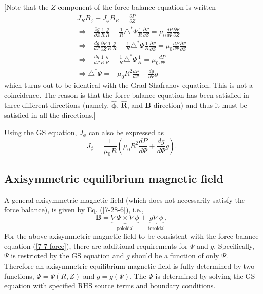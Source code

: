 \documentclass{llncs}
\newcommand{\tmmathbf}[1]{\ensuremath{\boldsymbol{#1}}}
\newcommand{\tmop}[1]{\ensuremath{\operatorname{#1}}}
\begin{document}
[Note that the $Z$ component of the force balance equation is written
\[ \begin{array}{l}
     J_R B_{\phi} - J_{\phi} B_R = \frac{\partial P}{\partial Z}\\
     \Rightarrow - \frac{\partial g}{\partial Z} \frac{1}{R} \frac{g}{R} -
     \frac{1}{R} \triangle^{\ast} \Psi \frac{1}{R} \frac{\partial
     \Psi}{\partial Z} = \mu_0 \frac{d P}{d \Psi} \frac{\partial
     \Psi}{\partial Z}\\
     \Rightarrow - \frac{d g}{d \Psi} \frac{\partial \Psi}{\partial Z}
     \frac{1}{R} \frac{g}{R} - \frac{1}{R} \triangle^{\ast} \Psi \frac{1}{R}
     \frac{\partial \Psi}{\partial Z} = \mu_0 \frac{d P}{d \Psi}
     \frac{\partial \Psi}{\partial Z}\\
     \Rightarrow - \frac{d g}{d \Psi} \frac{1}{R} \frac{g}{R} - \frac{1}{R}
     \triangle^{\ast} \Psi \frac{1}{R} = \mu_0 \frac{d P}{d \Psi}\\
     \Rightarrow \triangle^{\ast} \Psi = - \mu_0 R^2 \frac{d P}{d \Psi} -
     \frac{d g}{d \Psi} g
   \end{array} \]
which turns out to be identical with the Grad-Shafranov equation. This is not
a coincidence. The reason is that the force balance equation has been
satisfied in three different directions (namely, $\hat{\tmmathbf{\phi}}$,
$\hat{\mathbf{R}}$, and $\mathbf{B}$ direction) and thus it must be satisfied
in all the directions.]

Using the GS equation, $J_{\phi}$ can also be expressed as
\begin{equation}
  \label{24-5-29-p4} J_{\phi} = \frac{1}{\mu_0 R} \left( \mu_0 R^2 \frac{d
  P}{d \Psi} + \frac{d g}{d \Psi} g \right) .
\end{equation}

\subsection{Axisymmetric equilibrium magnetic field}

A general axisymmetric magnetic field (which does not necessarily satisfy the
force balance), is given by Eq. (\ref{7-28-6}), i.e.,
\begin{equation}
  \label{4-15-p3} \mathbf{B}= \underbrace{\nabla \Psi \times \nabla
  \phi}_{\tmop{poloidal}} + \underbrace{g \nabla \phi}_{\tmop{toroidal}},
\end{equation}
For the above axisymmetric magnetic field to be consistent with the force
balance equation (\ref{7-7-force}), there are additional requirements for
$\Psi$ and $g$. Specifically, $\Psi$ is restricted by the GS equation and $g$
should be a function of only $\Psi$. Therefore an axisymmetric equilibrium
magnetic field is fully determined by two functions, $\Psi = \Psi (R, Z)$ and
$g = g (\Psi)$. The $\Psi$ is determined by solving the GS equation with
specified RHS source terms and boundary conditions.
\end{document}
